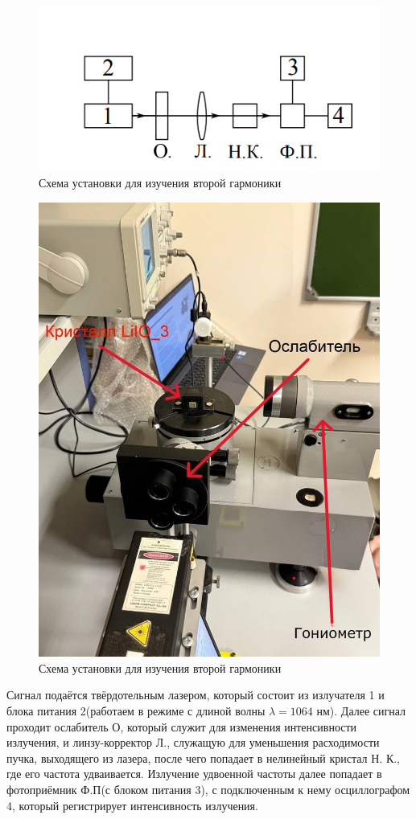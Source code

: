 \documentclass[a4paper,12pt]{article} %
\begin{document}
\begin{figure}[H]
\centering
\includegraphics[scale=1]{pic6.png}
\caption{Схема установки для изучения второй гармоники}
\label{scheme}
\end{figure}
\begin{figure}[H]
\centering
\includegraphics[scale=0.45]{goniometr.jpg}
\caption{Схема установки для изучения второй гармоники}
\label{scheme}
\end{figure}
Сигнал подаётся твёрдотельным лазером, который состоит из излучателя 1 и блока питания 2(работаем в режиме с длиной волны $\lambda = 1064$ нм). Далее сигнал проходит ослабитель О, который служит для изменения интенсивности излучения, и линзу-корректор Л., служащую для уменьшения расходимости пучка, выходящего из лазера, после чего попадает в нелинейный кристал Н. К., где его частота удваивается. Излучение удвоенной частоты далее попадает в фотоприёмник Ф.П(с блоком питания 3), с подключенным к нему осциллографом 4, который регистрирует интенсивность излучения.
\end{document}
